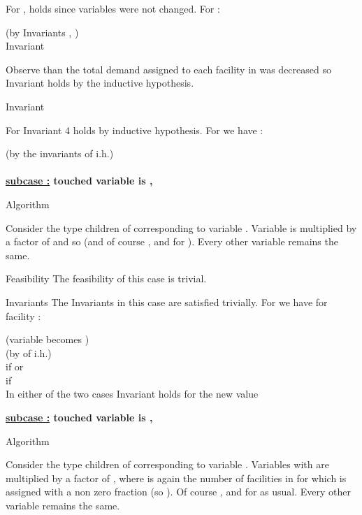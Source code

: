 \documentclass[11pt]{article}\usepackage{amsmath}
\begin{document}
For ,  holds since variables  were not changed. For :

\noindent
 \hfill (by Invariants , )\\


{\sf Invariant }

Observe than the total demand assigned to each facility in  was decreased so Invariant  holds by the 
inductive hypothesis.

{\sf Invariant }

For  Invariant 4 holds by inductive hypothesis. For  we have :

\noindent
 \hfill  (by the invariants of i.h.)\\
\\






\medskip
\noindent
  {\bf \underline{subcase :} touched variable is  , }

{\sc Algorithm}

Consider the type  children  of  corresponding to variable . Variable  is multiplied by a factor of  and so   (and  of course , and  for ). Every other variable remains the same.


{\sc Feasibility}
The feasibility of this case is trivial.

{\sc Invariants}
The Invariants    in this case are satisfied trivially. For  we have for facility :

\iffalse --------- previous derivation 
\noindent
\hfill (variable  becomes )\\
\hfill (by  of i.h.)\\
\hfill (being very generous)\\

-------------------- \fi 
\noindent
\hfill (variable  becomes )\\
\hfill (by  of i.h.)\\
\hfill  if   or \\
\hfill if \\ 

In either of the two cases Invariant  holds for the new value 



\medskip
\noindent
{\bf \underline{subcase  :} touched variable is  , }

{\sc Algorithm}

Consider the type  children  of  corresponding to variable . Variables  with  are multiplied by a factor of , where  is again the number of
facilities in  for which  is assigned with a non zero fraction (so ).
Of course , and  for  as usual. Every other variable remains the same.
\end{document}
